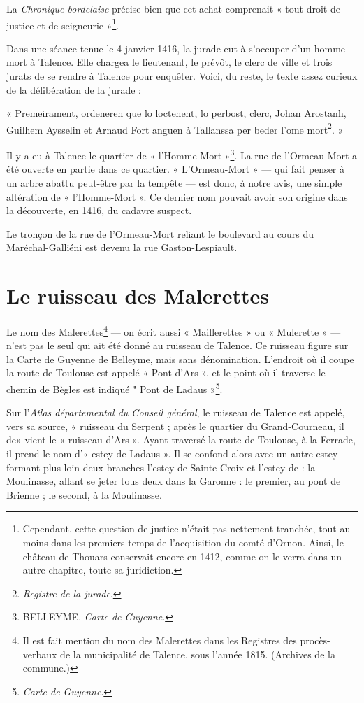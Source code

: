 La \textit{Chronique bordelaise} précise bien que cet achat comprenait « tout droit de justice et de seigneurie »\footnote{Cependant, cette question de justice n'était pas nettement tranchée, tout au moins dans les premiers temps de l'acquisition du comté d'Ornon. Ainsi, le château de Thouars conservait encore en 1412, comme on le verra dans un autre chapitre, toute sa juridiction.}. 

Dans une séance tenue le 4 janvier 1416, la jurade eut à s'occuper d'un homme mort à Talence. Elle chargea le lieutenant, le prévôt, le clerc de ville et trois jurats de se rendre à Talence pour enquêter. Voici, du reste, le texte assez curieux de la délibération de la jurade : 

« Premeirament, ordeneren que lo loctenent, lo perbost, clerc, Johan Arostanh, Guilhem Aysselin et Arnaud Fort anguen à Tallanssa per beder l'ome mort\footnote{\textit{Registre de la jurade}.}. » 

Il y a eu à Talence le quartier de « l'Homme-Mort »\footnote{BELLEYME. \textit{Carte de Guyenne}.}. La rue de l'Ormeau-Mort a été ouverte en partie dans ce quartier. « L'Ormeau-Mort » — qui fait penser à un arbre abattu peut-être par la tempête — est donc, à notre avis, une simple altération de « l'Homme-Mort ». Ce dernier nom pouvait avoir son origine dans la découverte, en 1416, du cadavre suspect.

Le tronçon de la rue de l'Ormeau-Mort reliant le boulevard au cours du Maréchal-Galliéni est devenu la rue Gaston-Lespiault.

\section{Le ruisseau des Malerettes} 

Le nom des Malerettes\footnote{Il est fait mention du nom des Malerettes dans les Registres des procès-verbaux de la municipalité de Talence, sous l'année 1815. (Archives de la commune.) } — on écrit aussi « Maillerettes » ou « Mulerette » — n'est pas le seul qui ait été donné au ruisseau de Talence. Ce ruisseau figure sur la Carte de Guyenne de Belleyme, mais sans dénomination. L'endroit  où il coupe la route de Toulouse est appelé « Pont d'Ars », et le point où il traverse le chemin de Bègles est indiqué " Pont de Ladaus »\footnote{\textit{Carte de Guyenne}.}.

Sur l'\textit{Atlas départemental du Conseil général}, le ruisseau de Talence est appelé, vers sa source, « ruisseau du Serpent ; après le quartier du Grand-Courneau, il de» vient le « ruisseau d'Ars ». Ayant traversé la route de Toulouse, à la Ferrade, il prend le nom d'« estey de Ladaus ». Il se confond alors avec un autre estey formant plus loin deux branches l'estey de Sainte-Croix et l'estey de : la Moulinasse, allant se jeter tous deux dans la Garonne : le premier, au pont de Brienne ; le second, à la Moulinasse.

